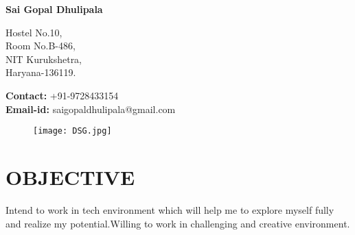 \documentclass[a4paper]{article}
\begin{document}
\begin{LARGE}
       \begin{center}
         \textrm{\textbf{Sai Gopal Dhulipala}}
       \end{center} 
     \noindent\makebox[\linewidth]{\rule{\paperwidth}{0.4pt}}
\end{LARGE}
   \begin{Large}

     \begin{minipage}[t]{0.5\textwidth}
        Hostel No.10,\\
        Room No.B-486,\\
        NIT Kurukshetra,\\
        Haryana-136119.
     \end{minipage}
     \begin{minipage}[t]{0.5\textwidth}
        \textbf{Contact:} +91-9728433154\\
        \textbf{Email-id:} saigopaldhulipala@gmail.com
     \end{minipage}
   \end{Large}
   \begin{figure}[h]
         \begin{flushright}
           \texttt{[image: DSG.jpg]}
         \end{flushright}
     \end{figure}
     \section*{\textbf{OBJECTIVE}}
Intend to work in tech environment which will help me to explore myself fully and realize my potential.Willing to work in challenging and creative environment.
\end{document}

